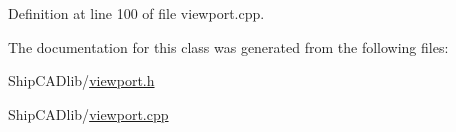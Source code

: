 Definition at line 100 of file viewport.\-cpp.



The documentation for this class was generated from the following files\-:\begin{DoxyCompactItemize}
\item 
Ship\-C\-A\-Dlib/\hyperlink{viewport_8h}{viewport.\-h}\item 
Ship\-C\-A\-Dlib/\hyperlink{viewport_8cpp}{viewport.\-cpp}\end{DoxyCompactItemize}
